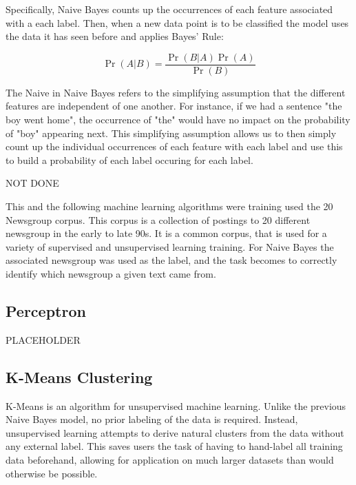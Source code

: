 \documentclass[conference]{IEEEtran}
\begin{document}
Specifically, Naive Bayes counts up the occurrences of each feature associated with a each label. 
Then, when a new data point is to be classified the model uses the data it has seen before and applies Bayes' Rule:

\begin{equation}
    \Pr(A|B)=\frac{\Pr(B|A)\Pr(A)}{\Pr(B)}
\end{equation}

The Naive in Naive Bayes refers to the simplifying assumption that the different features
are independent of one another. 
For instance, if we had a sentence "the boy went home", the occurrence of "the" would 
have no impact on the probability of "boy" appearing next. 
This simplifying assumption allows us to then simply count up the individual occurrences
of each feature with each label and use this to build a probability of each label occuring
for each label.


NOT DONE





This and the following machine learning algorithms were training used the 20 Newsgroup corpus\cite{20Newsgroup}.
This corpus is a collection of postings to 20 different newsgroup in the early to late
90s.
It is a common corpus, that is used for a variety of supervised and unsupervised learning
training.
For Naive Bayes the associated newsgroup was used as the label, and the task becomes to
correctly identify which newsgroup a given text came from.


\subsection{Perceptron}

PLACEHOLDER

\subsection{K-Means Clustering}

K-Means\cite{forgy1965cluster} is an algorithm for unsupervised machine learning. 
Unlike the previous Naive Bayes model, no prior labeling of the data is required.
Instead, unsupervised learning attempts to derive natural clusters from 
the data without any external label.
This saves users the task of having to hand-label all training data 
beforehand, allowing for application on much larger datasets than would 
otherwise be possible.
\end{document}
